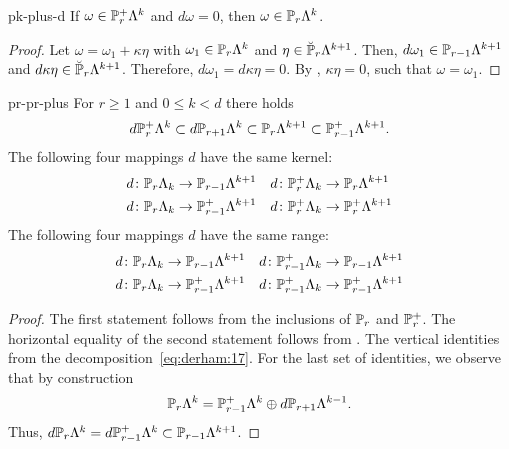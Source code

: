 \begin{Lemma}{pk-plus-d}
  If $\omega\in \P_r^+\Lambda^k$ and $d\omega=0$, then
  $\omega\in\P_r\Lambda^k$.
\end{Lemma}

\begin{proof}
  Let $\omega = \omega_1 + \kappa\eta$ with $\omega_1\in\P_r\Lambda^k$
  and $\eta\in \breve\P_r\Lambda^{k+1}$. Then,
  $d\omega_1\in\P_{r-1}\Lambda^{k+1}$ and
  $d\kappa\eta\in \breve\P_r\Lambda^{k+1}$. Therefore,
  $d\omega_1 = d\kappa\eta = 0$. By
  , $\kappa\eta=0$, such that
  $\omega=\omega_1$.
\end{proof}

\begin{Lemma}{pr-pr-plus}
  For $r\ge 1$ and $0\le k < d$ there holds
  \begin{gather}
    d\P_{r}^+\Lambda^k \subset d\P_{r+1}\Lambda^k
    \subset \P_r\Lambda^{k+1}
    \subset \P_{r-1}^+\Lambda^{k+1}.
  \end{gather}
  The following four mappings $d$ have the same kernel:
  \begin{gather}
    \begin{aligned}
      d\colon \P_r\Lambda_k &\to \P_{r-1}\Lambda^{k+1}
      &
      d\colon \P_r^+\Lambda_k &\to \P_{r}\Lambda^{k+1}
      \\
      d\colon \P_r\Lambda_k &\to \P_{r-1}^+\Lambda^{k+1}
      &
      d\colon \P_r^+\Lambda_k &\to \P_{r}^+\Lambda^{k+1}
    \end{aligned}
  \end{gather}
  The following four mappings $d$ have the same range:
  \begin{gather}
    \begin{aligned}
      d\colon \P_r\Lambda_k &\to \P_{r-1}\Lambda^{k+1}
      &
      d\colon \P_{r-1}^+\Lambda_k &\to \P_{r-1}\Lambda^{k+1}
      \\
      d\colon \P_r\Lambda_k &\to \P_{r-1}^+\Lambda^{k+1}
      &
      d\colon \P_{r-1}^+\Lambda_k &\to \P_{r-1}^+\Lambda^{k+1}
    \end{aligned}
  \end{gather}
\end{Lemma}

\begin{proof}
  The first statement follows from the inclusions of $\P_r$ and
  $\P_r^+$. The horizontal equality of the second statement follows
  from . The vertical identities from the
  decomposition~\eqref{eq:derham:17}. For the last set of identities,
  we observe that by construction
  \begin{gather*}
    \P_r\Lambda^k = \P_{r-1}^+\Lambda^k \oplus d \P_{r+1}\Lambda^{k-1}.
  \end{gather*}
  Thus, $d\P_r\Lambda^k = d\P_{r-1}^+\Lambda^k\subset \P_{r-1}\Lambda^{k+1}$.
\end{proof}

